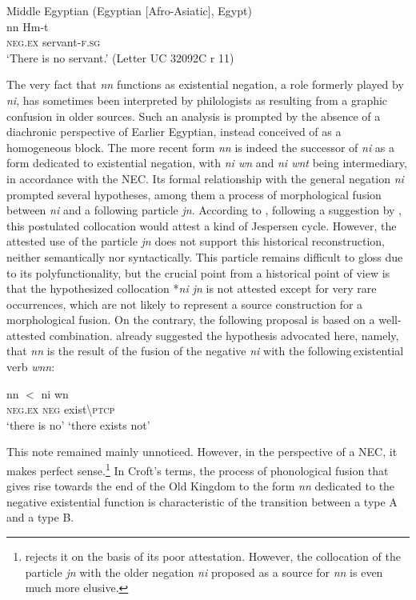 \documentclass[output=paper]{langsci/langscibook}
\begin{document}
\ea Middle Egyptian (Egyptian [Afro-Asiatic], Egypt) \label{ex:AE28}\\
    \gll nn Hm-t \\
    \textsc{neg.ex} servant-\textsc{f.sg}\\ 
    \glt ‘There is no servant.’ (Letter UC 32092C r 11)
\z 

The very fact that \textit{nn} functions as existential negation, a role formerly played by \textit{ni}, has sometimes been interpreted by philologists as resulting from a graphic confusion in older sources. Such an analysis is prompted by the absence of a diachronic perspective of Earlier Egyptian, instead conceived of as a homogeneous block. The more recent form \textit{nn} is indeed the successor of \textit{ni} as a form dedicated to existential negation, with \textit{ni wn} and \textit{ni wnt} being intermediary, in accordance with the NEC. Its formal relationship with the general negation \textit{ni} prompted several hypotheses, among them a process of morphological fusion between \textit{ni} and a following particle \textit{jn}. According to \citet[127]{Loprieno1995}, following a suggestion by \citet{Osing1979}, this postulated collocation would attest a kind of Jespersen cycle. However, the attested use of the particle \textit{jn} does not support this historical reconstruction, neither semantically nor syntactically. This particle remains difficult to gloss due to its polyfunctionality, but the crucial point from a historical point of view is that the hypothesized collocation *\textit{ni jn} is not attested except for very rare occurrences, which are not likely to represent a source construction for a morphological fusion. On the contrary, the following proposal is based on a well-attested combination. \citet[359]{Vergote1965formes} already suggested the hypothesis advocated here, namely, that \textit{nn} is the result of the fusion of the negative \textit{ni} with the following existential verb \textit{wnn}:  

\ea \label{ex:AE29}
    \gll nn $<$ ni wn\\ 
    \textsc{neg.ex} {} \textsc{neg} exist\textbackslash\textsc{ptcp} \\
    \glt ‘there is no’ ‘there exists not’ 
\z

This note remained mainly unnoticed. However, in the perspective of a NEC, it makes perfect sense.\footnote{\citet[311]{Osing1979} rejects it on the basis of its poor attestation. However, the collocation of the particle \textit{jn} with the older negation \textit{ni} proposed as a source for \textit{nn} is even much more elusive.} In Croft’s \citeyearpar{Croft1991} terms, the process of phonological fusion that gives rise towards the end of the Old Kingdom to the form \textit{nn} dedicated to the negative existential function is characteristic of the transition between a type A and a type B.  
 
\end{document}

